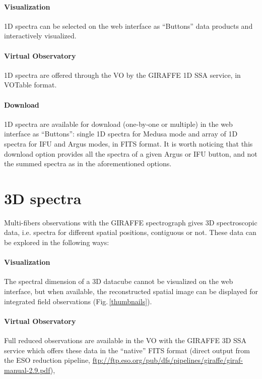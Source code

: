 \documentclass[11pt,twoside]{article}
\begin{document}
\paragraph{Visualization} 1D spectra can be selected on the web interface as ``Buttons'' data products and interactively visualized.
\paragraph{Virtual Observatory} 1D spectra are offered through the VO by the GIRAFFE 1D SSA service, in VOTable format.
\paragraph{Download} 1D spectra are available for download (one-by-one or multiple) in the web interface as ``Buttons'': single 1D spectra for Medusa mode and array of 1D spectra for IFU and Argus modes, in FITS format. It is worth noticing that this download option provides all the spectra of a given Argus or IFU button, and not the summed spectra as in the aforementioned options. 

\section{3D spectra}

Multi-fibers observations with the GIRAFFE spectrograph gives 3D spectroscopic data, i.e. spectra for different spatial positions, contiguous or not. These data can be explored in the following ways:
\paragraph{Visualization} The spectral dimension of a 3D datacube cannot be visualized on the web interface, but when available, the reconstructed spatial image can be displayed for integrated field observations (Fig.\,\ref{thumbnails}).
\paragraph{Virtual Observatory} Full reduced observations are available in the VO with the GIRAFFE 3D SSA service which offers these data in the ``native'' FITS format (direct output from the ESO reduction pipeline, \url{ftp://ftp.eso.org/pub/dfs/pipelines/giraffe/giraf-manual-2.9.pdf}),
\end{document}
